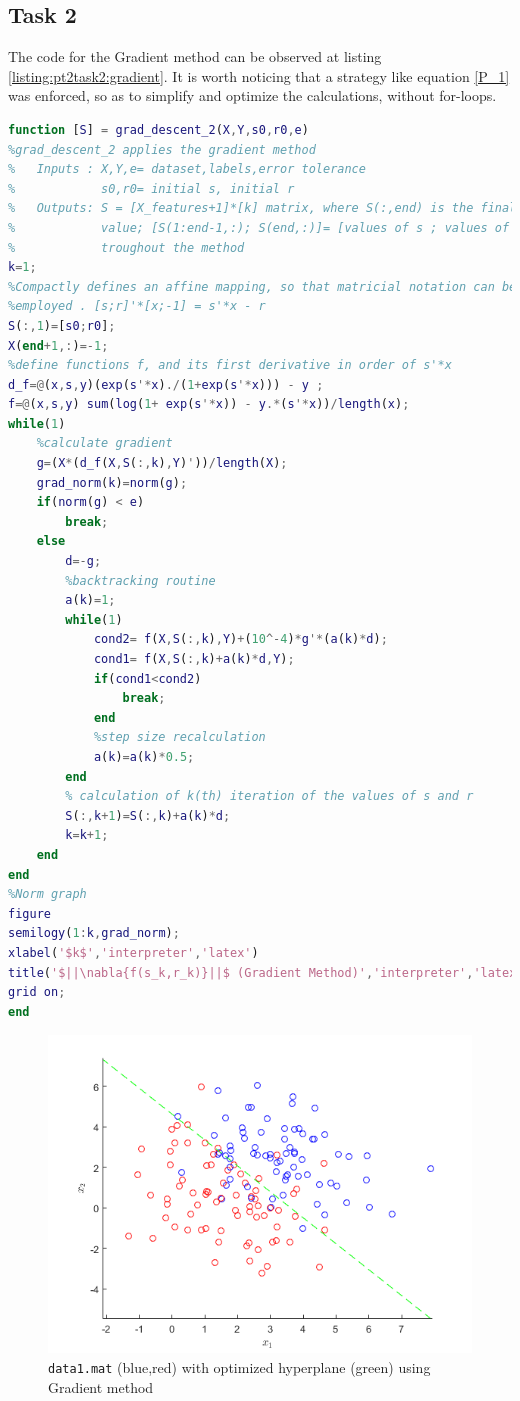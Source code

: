 \subsection{Task 2}
The code for the Gradient method can be observed at listing \ref{listing:pt2task2:gradient}. It is worth noticing that a strategy like equation \ref{P_1} was enforced, so as to simplify and optimize the calculations, without for-loops.
\begin{lstlisting}[language=Matlab, caption=Matlab code for the Gradient method., label=listing:pt2task2:gradient]
function [S] = grad_descent_2(X,Y,s0,r0,e)
%grad_descent_2 applies the gradient method
%   Inputs : X,Y,e= dataset,labels,error tolerance
%            s0,r0= initial s, initial r
%   Outputs: S = [X_features+1]*[k] matrix, where S(:,end) is the final
%            value; [S(1:end-1,:); S(end,:)]= [values of s ; values of r] 
%            troughout the method
k=1;
%Compactly defines an affine mapping, so that matricial notation can be
%employed . [s;r]'*[x;-1] = s'*x - r 
S(:,1)=[s0;r0];
X(end+1,:)=-1;
%define functions f, and its first derivative in order of s'*x
d_f=@(x,s,y)(exp(s'*x)./(1+exp(s'*x))) - y ;
f=@(x,s,y) sum(log(1+ exp(s'*x)) - y.*(s'*x))/length(x);
while(1)
    %calculate gradient
    g=(X*(d_f(X,S(:,k),Y)'))/length(X);
    grad_norm(k)=norm(g);
    if(norm(g) < e)
        break;
    else
        d=-g;
        %backtracking routine
        a(k)=1;
        while(1)
            cond2= f(X,S(:,k),Y)+(10^-4)*g'*(a(k)*d);
            cond1= f(X,S(:,k)+a(k)*d,Y);
            if(cond1<cond2)
                break;
            end
            %step size recalculation
            a(k)=a(k)*0.5;
        end
        % calculation of k(th) iteration of the values of s and r 
        S(:,k+1)=S(:,k)+a(k)*d;
        k=k+1;
    end
end
%Norm graph
figure
semilogy(1:k,grad_norm);
xlabel('$k$','interpreter','latex')
title('$||\nabla{f(s_k,r_k)}||$ (Gradient Method)','interpreter','latex')
grid on;
end

\end{lstlisting}
\begin{figure}[!htb]
	\centering
	\includegraphics[width=0.5\linewidth]{part2/figures/T2_Line.png}
	\caption{\texttt{data1.mat} (blue,red) with optimized hyperplane (green) using Gradient method}\label{pt2task2:graph}		
\end{figure}
